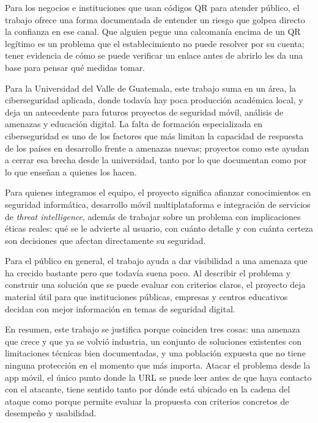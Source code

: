 Para los negocios e instituciones que usan códigos QR para atender público, el
trabajo ofrece una forma documentada de entender un riesgo que golpea directo la
confianza en ese canal. Que alguien pegue una calcomanía encima de un QR legítimo
\cite{krombholz2014qr} es un problema que el establecimiento no puede resolver por su
cuenta; tener evidencia de cómo se puede verificar un enlace antes de abrirlo les da
una base para pensar qué medidas tomar.

Para la Universidad del Valle de Guatemala, este trabajo suma en un área,
la ciberseguridad aplicada, donde todavía hay poca producción académica local, y deja
un antecedente para futuros proyectos de seguridad móvil, análisis de amenazas y
educación digital. La falta de formación especializada en ciberseguridad es uno de
los factores que más limitan la capacidad de respuesta de los países en desarrollo
frente a amenazas nuevas; proyectos como este ayudan a cerrar esa brecha desde la
universidad, tanto por lo que documentan como por lo que enseñan a quienes los hacen.

Para quienes integramos el equipo, el proyecto significa afianzar conocimientos en
seguridad informática, desarrollo móvil multiplataforma e integración de servicios de
\emph{threat intelligence}, además de trabajar sobre un problema con implicaciones
éticas reales: qué se le advierte al usuario, con cuánto detalle y con cuánta certeza
son decisiones que afectan directamente su seguridad.

Para el público en general, el trabajo ayuda a dar visibilidad a una amenaza que ha
crecido bastante pero que todavía suena poco. Al describir el problema y construir
una solución que se puede evaluar con criterios claros, el proyecto deja material
útil para que instituciones públicas, empresas y centros educativos decidan con mejor
información en temas de seguridad digital.

En resumen, este trabajo se justifica porque coinciden tres cosas: una amenaza que
crece y que ya se volvió industria, un conjunto de soluciones existentes con
limitaciones técnicas bien documentadas, y una población expuesta que no tiene ninguna
protección en el momento que más importa. Atacar el problema desde la app móvil, el
único punto donde la URL se puede leer antes de que haya contacto con el atacante,
tiene sentido tanto por dónde está ubicado en la cadena del ataque como porque
permite evaluar la propuesta con criterios concretos de desempeño y usabilidad.
